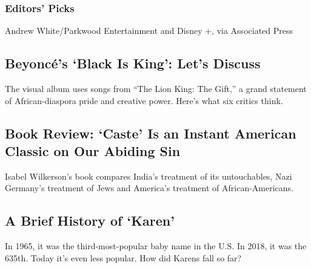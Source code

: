 \hypertarget{editors-picks}{%
\subsubsection{Editors' Picks}\label{editors-picks}}

\href{/2020/07/31/arts/music/beyonce-black-is-king.html}{}

Andrew White/Parkwood Entertainment and Disney +, via Associated Press

\href{/2020/07/31/arts/music/beyonce-black-is-king.html}{}

\hypertarget{beyoncuxe9s-black-is-king-lets-discuss}{%
\subsection{Beyoncé's `Black Is King': Let's
Discuss}\label{beyoncuxe9s-black-is-king-lets-discuss}}

The visual album uses songs from ``The Lion King: The Gift,'' a grand
statement of African-diaspora pride and creative power. Here's what six
critics think.

\href{/2020/07/31/books/review-caste-isabel-wilkerson-origins-of-our-discontents.html}{}

\hypertarget{book-review-caste-is-an-instant-american-classic-on-our-abiding-sin}{%
\subsection{Book Review: `Caste' Is an Instant American Classic on Our
Abiding
Sin}\label{book-review-caste-is-an-instant-american-classic-on-our-abiding-sin}}

Isabel Wilkerson's book compares India's treatment of its untouchables,
Nazi Germany's treatment of Jews and America's treatment of
African-Americans.

\href{/2020/07/31/books/review-caste-isabel-wilkerson-origins-of-our-discontents.html}{}

\href{/2020/07/31/style/karen-name-meme-history.html}{}

\hypertarget{a-brief-history-of-karen}{%
\subsection{A Brief History of `Karen'}\label{a-brief-history-of-karen}}

In 1965, it was the third-most-popular baby name in the U.S. In 2018, it
was the 635th. Today it's even less popular. How did Karens fall so far?

